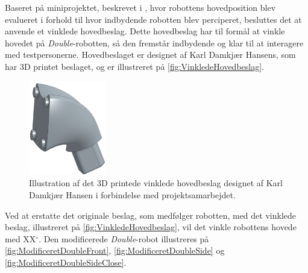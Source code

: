 Baseret på miniprojektet, beskrevet i \fullref{\MiniprojektHovedeVinkelpartname}, hvor robottens hovedposition blev evalueret i forhold til hvor indbydende robotten blev perciperet, besluttes det at anvende et vinklede hovedbeslag. Dette hovedbeslag har til formål at vinkle hovedet på \textit{Double}-robotten, så den fremstår indbydende og klar til at interagere med testpersonerne. Hovedbeslaget er designet af Karl Damkjær Hansens, som har 3D printet beslaget, og er illustreret på \autoref{fig:VinkledeHovedbeslag}.            
%
\begin{figure}[H]
\centering
\includegraphics[width = 0.3\textwidth]{Figure/TestdesignParametre/VinkledeHovedbeslag} 
\caption{Illustration af det 3D printede vinklede hovedbeslag designet af Karl Damkjær Hansen i forbindelse med projektsamarbejdet.}
\label{fig:VinkledeHovedbeslag}
\end{figure}
\noindent
%
Ved at erstatte det originale beslag, som medfølger robotten, med det vinklede beslag, illustreret på \autoref{fig:VinkledeHovedbeslag}, vil det vinkle robottens hovede med XX$^{\circ}$. Den modificerede \textit{Double}-robot illustreres på \autoref{fig:ModificeretDoubleFront}, \autoref{fig:ModificeretDoubleSide} og \autoref{fig:ModificeretDoubleSideClose}.
%
